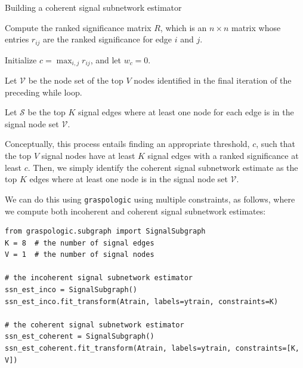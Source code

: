 \begin{algorithm}
\label{alg:ch9:ssn_coherent}
\caption{Building a coherent signal subnetwork estimator}
\SetAlgoLined

Compute the ranked significance matrix $R$, which is an $n \times n$ matrix whose entries $r_{ij}$ are the ranked significance for edge $i$ and $j$.

Initialize $c = \max_{i,j}r_{ij}$, and let $w_c = 0$.


Let $\mathcal V$ be the node set of the top $V$ nodes identified in the final iteration of the preceding while loop.

Let $\mathcal S$ be the top $K$ signal edges where at least one node for each edge is in the signal node set $\mathcal V$.

\end{algorithm}

Conceptually, this process entails finding an appropriate threshold, $c$, such that the top $V$ signal nodes have at least $K$ signal edges with a ranked significance at least $c$. Then, we simply identify the coherent signal subnetwork estimate as the top $K$ edges where at least one node is in the signal node set $\mathcal V$.

We can do this using \texttt{graspologic} using multiple constraints, as follows, where we compute both incoherent and coherent signal subnetwork estimates:

\begin{lstlisting}[style=python]
from graspologic.subgraph import SignalSubgraph
K = 8  # the number of signal edges
V = 1  # the number of signal nodes

# the incoherent signal subnetwork estimator
ssn_est_inco = SignalSubgraph()
ssn_est_inco.fit_transform(Atrain, labels=ytrain, constraints=K)

# the coherent signal subnetwork estimator
ssn_est_coherent = SignalSubgraph()
ssn_est_coherent.fit_transform(Atrain, labels=ytrain, constraints=[K, V])
\end{lstlisting}

